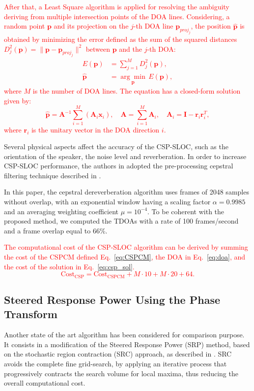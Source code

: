 \documentclass[review]{elsarticle}
\let\originaleqref=\eqref
\renewcommand{\eqref}{Eq.~\originaleqref}
\begin{document}
\textcolor{red}{After that, a Least Square algorithm is applied for resolving the ambiguity deriving from multiple intersection points of the DOA lines.  Considering, a random point $\mathbf{p}$ and its projection on the $j$-th DOA line $\mathbf{p}_{proj_j}$, the position $\hat{\mathbf{p}}$ is obtained by minimizing the error defined as the sum of the squared distances $D^2_j(\mathbf{p}) = \|\mathbf{p}-\mathbf{p}_{proj_j}\|^2$ between $\mathbf{p}$ and the $j$-th DOA:
\begin{align}
E(\mathbf{p}) &= \sum_{j=1}^M D^2_j (\mathbf{p}),\\
\hat{\mathbf{p}} & =  \underset{\mathbf{p}} {\arg \min} \,E(\mathbf{p}), \label{eq:ls}
\end{align}
where $M$ is the number of DOA lines. The equation has a closed-form solution given by:
\begin{equation}\label{eq:csp_sol}
\hat{\mathbf{p}} = \mathbf{A}^{-1} \sum_{i=1}^M (\mathbf{A}_i\mathbf{x}_i), \quad \mathbf{A} = \sum_{i=1}^M\mathbf{A}_i, \quad \mathbf{A}_i=\mathbf{I}-\mathbf{r}_i \mathbf{r}_i^T,
\end{equation}
where $\mathbf{r}_i$ is the unitary vector in the DOA direction $i$.}

Several physical aspects affect the accuracy of the CSP-SLOC, such as the orientation of the speaker, the noise level and reverberation. In order to increase CSP-SLOC performance, the authors in \cite{tsiami2014experiments} adopted the pre-processing cepstral filtering technique described in \cite{stephenne1997new}. 

In this paper, the cepstral dereverberation algorithm uses frames of 2048 samples without overlap, with an exponential window having a scaling factor $\alpha = 0.9985$ and an averaging weighting coefficient $\mu=10^{-4}$. To be coherent with the proposed method, we computed the TDOAs with a rate of 100 frames/second and a frame overlap equal to 66\%.

\textcolor{red}{The computational cost of the CSP-SLOC algorithm can be derived by summing the cost of the CSPCM defined \eqref{eq:CSPCM}, the DOA in \eqref{eq:doa}, and the cost of the solution in \eqref{eq:csp_sol}.
\begin{equation}\label{eq:cost_csp}
\text{Cost}_{\text{CSP}}= \text{Cost}_{\text{CSPCM}} + M\cdot10 + M\cdot20 + 64.
\end{equation}
}


\subsection{Steered Response Power Using the Phase Transform}
Another state of the art algorithm has been considered for comparison purpose. It consists in a modification of the Steered Response Power (SRP) method, based on the stochastic region contraction (SRC) approach, as described in \cite{DoSY07}. SRC avoids the complete fine grid-search, by applying an iterative process that progressively contracts the search volume for local maxima, thus reducing the overall computational cost.
\end{document}
